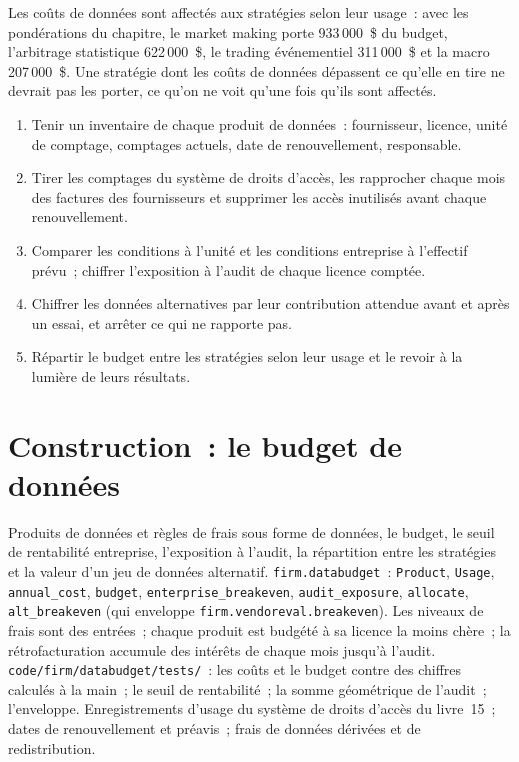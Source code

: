 Les coûts de données sont affectés aux stratégies selon leur usage~: avec les pondérations du chapitre, le market making porte 933\,000~\$ du budget, l'arbitrage statistique
622\,000~\$, le trading événementiel 311\,000~\$ et la macro 207\,000~\$. Une stratégie dont les coûts de données dépassent ce qu'elle en tire ne devrait pas
les porter, ce qu'on ne voit qu'une fois qu'ils sont affectés.

\begin{method}\label{met:fm:data-strategy-and-costs:run}
\begin{enumerate}
\item Tenir un inventaire de chaque produit de données~: fournisseur, licence, unité de comptage, comptages actuels, date de renouvellement, responsable.
\item Tirer les comptages du système de droits d'accès, les rapprocher chaque mois des factures des fournisseurs et supprimer les accès inutilisés avant chaque renouvellement.
\item Comparer les conditions à l'unité et les conditions entreprise à l'effectif prévu~; chiffrer l'exposition à l'audit de chaque licence comptée.
\item Chiffrer les données alternatives par leur contribution attendue avant et après un essai, et arrêter ce qui ne rapporte pas.
\item Répartir le budget entre les stratégies selon leur usage et le revoir à la lumière de leurs résultats.
\end{enumerate}
\end{method}

\section{Construction~: le budget de données}\label{bld:fm:data-strategy-and-costs:databudget}

\begin{build}
 Produits de données et règles de frais sous forme de données, le budget, le seuil de rentabilité entreprise, l'exposition à l'audit, la répartition entre les stratégies et la valeur
d'un jeu de données alternatif.
 \texttt{firm.databudget}~: \texttt{Product}, \texttt{Usage}, \texttt{annual\_cost}, \texttt{budget}, \texttt{enterprise\_breakeven},
\texttt{audit\_exposure}, \texttt{allocate}, \texttt{alt\_breakeven} (qui enveloppe \texttt{firm.vendoreval.breakeven}).
 Les niveaux de frais sont des entrées~; chaque produit est budgété à sa licence la moins chère~; la rétrofacturation accumule des intérêts de chaque mois jusqu'à l'audit.
 \texttt{code/firm/databudget/tests/}~: les coûts et le budget contre des chiffres calculés à la main~; le seuil de rentabilité~; la somme géométrique de l'audit~;
l'enveloppe.
 Enregistrements d'usage du système de droits d'accès du livre~15~; dates de renouvellement et préavis~; frais de données dérivées et de redistribution.
\end{build}

